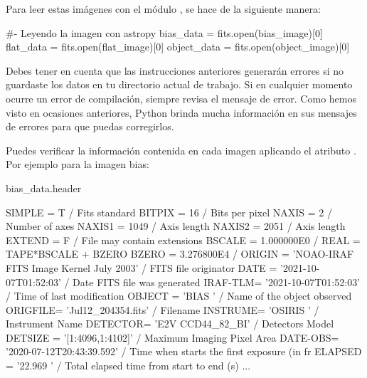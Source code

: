 Para leer estas imágenes con el módulo , se hace de la siguiente manera:

\begin{pyin}[]
#- Leyendo la imagen con astropy
bias_data   = fits.open(bias_image)[0]
flat_data   = fits.open(flat_image)[0]
object_data = fits.open(object_image)[0]
\end{pyin}

Debes tener en cuenta que las instrucciones anteriores generarán errores si no guardaste los datos en tu directorio actual de trabajo. Si en cualquier momento ocurre un error de compilación, siempre revisa el mensaje de error. Como hemos visto en ocasiones anteriores, Python brinda mucha información en sus mensajes de errores para que puedas corregirlos. 

Puedes verificar la información contenida en cada imagen aplicando el atributo . Por ejemplo para la imagen bias:

\begin{pyin}
bias_data.header
\end{pyin}
\begin{pyprint}
SIMPLE  =                    T / Fits standard                                  
BITPIX  =                   16 / Bits per pixel                                 
NAXIS   =                    2 / Number of axes                                 
NAXIS1  =                 1049 / Axis length                                    
NAXIS2  =                 2051 / Axis length                                    
EXTEND  =                    F / File may contain extensions                    
BSCALE  =           1.000000E0 / REAL = TAPE*BSCALE + BZERO                     
BZERO   =           3.276800E4 /                                                
ORIGIN  = 'NOAO-IRAF FITS Image Kernel July 2003' / FITS file originator        
DATE    = '2021-10-07T01:52:03' / Date FITS file was generated                  
IRAF-TLM= '2021-10-07T01:52:03' / Time of last modification                     
OBJECT  = 'BIAS    '           / Name of the object observed                    
ORIGFILE= 'Jul12_204354.fits'  / Filename                                       
INSTRUME= 'OSIRIS  '           / Instrument Name                                
DETECTOR= 'E2V CCD44_82_BI'    / Detectors Model                                
DETSIZE = '[1:4096,1:4102]'    / Maximum Imaging Pixel Area                     
DATE-OBS= '2020-07-12T20:43:39.592' / Time when starts the first exposure (in fr
ELAPSED = '22.969  '           / Total elapsed time from start to end (s)       
...       
\end{pyprint}

